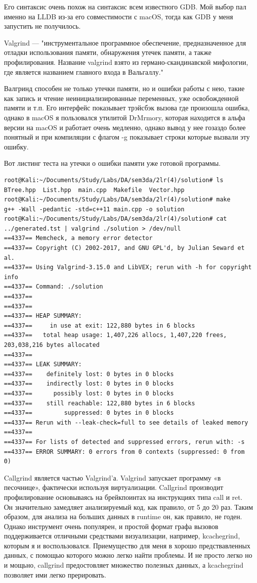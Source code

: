 \documentclass[12pt]{article}
\begin{document}
Его синтаксис очень похож на синтаксис всем известного GDB. Мой выбор пал именно на LLDB из-за его совместимости с macOS, тогда как GDB у меня запустить не получилось.


Valgrind — "инструментальное программное обеспечение, предназначенное для отладки использования памяти, обнаружения утечек памяти, а также профилирования. Название valgrind взято из германо-скандинавской мифологии, где является названием главного входа в Вальгаллу."


Валгринд способен не только утечки памяти, но и ошибки работы с нею, такие как запись и чтение неинициализированные переменных, уже освобожденной памяти и т.п. Его интерфейс показывает трэйсбэк вызова где произошла ошибка, однако в macOS я пользовался утилитой DrMrmory, которая находится в альфа версии на macOS и работает очень медленно, однако вывод у нее гозаздо более понятный и при компиляции с флагом -g показывает строки которые вызвали эту ошибку.

Вот листинг теста на утечки о ошибки памяти уже готовой программы.

\begin{lstlisting}
root@Kali:~/Documents/Study/Labs/DA/sem3da/2lr(4)/solution# ls
BTree.hpp  List.hpp  main.cpp  Makefile  Vector.hpp
root@Kali:~/Documents/Study/Labs/DA/sem3da/2lr(4)/solution# make
g++ -Wall -pedantic -std=c++11 main.cpp -o solution
root@Kali:~/Documents/Study/Labs/DA/sem3da/2lr(4)/solution# cat ../generated.tst | valgrind ./solution > /dev/null
==4337== Memcheck, a memory error detector
==4337== Copyright (C) 2002-2017, and GNU GPL'd, by Julian Seward et al.
==4337== Using Valgrind-3.15.0 and LibVEX; rerun with -h for copyright info
==4337== Command: ./solution
==4337== 
==4337== 
==4337== HEAP SUMMARY:
==4337==     in use at exit: 122,880 bytes in 6 blocks
==4337==   total heap usage: 1,407,226 allocs, 1,407,220 frees, 203,038,216 bytes allocated
==4337== 
==4337== LEAK SUMMARY:
==4337==    definitely lost: 0 bytes in 0 blocks
==4337==    indirectly lost: 0 bytes in 0 blocks
==4337==      possibly lost: 0 bytes in 0 blocks
==4337==    still reachable: 122,880 bytes in 6 blocks
==4337==         suppressed: 0 bytes in 0 blocks
==4337== Rerun with --leak-check=full to see details of leaked memory
==4337== 
==4337== For lists of detected and suppressed errors, rerun with: -s
==4337== ERROR SUMMARY: 0 errors from 0 contexts (suppressed: 0 from 0)
\end{lstlisting}

Callgrind является частью Valgrind'а. Valgrind запускает программу «в песочнице», фактически используя виртуализации. Callgrind производит профилирование основываясь на брейкпоинтах на инструкциях типа call и ret. Он значительно замедляет анализируемый код, как правило, от 5 до 20 раз. Таким образом, для анализа на больших данных в runtime он, как правило, не годен.
Однако инструмент очень популярен, и простой формат графа вызовов поддерживается отличными средствами визуализации, например, kcachegrind, которым я и воспользовался. Приемущество для меня в хорошо предствавленных данных, с помощью которого можно легко найти проблемы. И не просто легко но и мощьно, callgrind предостовляет множество полезных данных, а kcachegrind позволяет ими легко прерировать.
\end{document}
